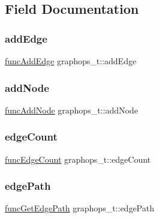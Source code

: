 \subsection{Field Documentation}
\mbox{\label{structgraphops__t_af9a74b6643b49f7799dfa78f4824aa22}} 
\subsubsection{\texorpdfstring{add\+Edge}{addEdge}}
{\footnotesize\ttfamily \hyperlink{graphops_8h_a7db3802ca9110f9f9095250ed85a39a5}{func\+Add\+Edge} graphops\+\_\+t\+::add\+Edge}

\mbox{\label{structgraphops__t_aa1fdab76a86ab2889415964b51f1738f}} 
\subsubsection{\texorpdfstring{add\+Node}{addNode}}
{\footnotesize\ttfamily \hyperlink{graphops_8h_ac3a2b8cb9dcf1f1a8cd4cb5f819e245a}{func\+Add\+Node} graphops\+\_\+t\+::add\+Node}

\mbox{\label{structgraphops__t_a5db6e2eee59ada7705fb54bf5f6b9ee1}} 
\subsubsection{\texorpdfstring{edge\+Count}{edgeCount}}
{\footnotesize\ttfamily \hyperlink{graphops_8h_a9c7f99c0f38ebae08cb49e70ffe91fa1}{func\+Edge\+Count} graphops\+\_\+t\+::edge\+Count}

\mbox{\label{structgraphops__t_ab0fdace070db2a1fa199e920b6136a04}} 
\subsubsection{\texorpdfstring{edge\+Path}{edgePath}}
{\footnotesize\ttfamily \hyperlink{graphops_8h_ac2b0381c5a4018e52104e27c57fb5c2c}{func\+Get\+Edge\+Path} graphops\+\_\+t\+::edge\+Path}


